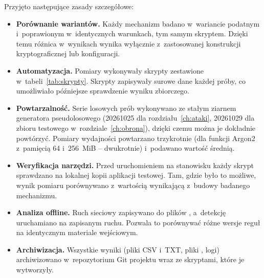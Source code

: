 Przyjęto następujące zasady szczegółowe:
\begin{itemize}
  \item \textbf{Porównanie wariantów.} Każdy mechanizm badano w~wariancie podatnym i~poprawionym w~identycznych warunkach, tym samym skryptem. Dzięki temu różnica w~wynikach wynika wyłącznie z~zastosowanej konstrukcji kryptograficznej lub konfiguracji.
  \item \textbf{Automatyzacja.} Pomiary wykonywały skrypty zestawione w~tabeli~\ref{tab:skrypty}. Skrypty zapisywały surowe dane każdej próby, co umożliwiało późniejsze sprawdzenie wyniku zbiorczego.
  \item \textbf{Powtarzalność.} Serie losowych prób wykonywano ze stałym ziarnem generatora pseudolosowego (20261025 dla rozdziału~\ref{ch:ataki}, 20261029 dla zbioru testowego w~rozdziale~\ref{ch:obrona}), dzięki czemu można je dokładnie powtórzyć. Pomiary wydajności powtarzano trzykrotnie (dla funkcji Argon2 z~pamięcią 64 i~256~MiB -- dwukrotnie) i~podawano wartość średnią.
  \item \textbf{Weryfikacja narzędzi.} Przed uruchomieniem na stanowisku każdy skrypt sprawdzano na lokalnej kopii aplikacji testowej. Tam, gdzie było to możliwe, wynik pomiaru porównywano z~wartością wynikającą z~budowy badanego mechanizmu.
  \item \textbf{Analiza offline.} Ruch sieciowy zapisywano do plików , a~detekcję uruchamiano na zapisanym ruchu. Pozwala to porównywać różne wersje reguł na identycznym materiale wejściowym.
  \item \textbf{Archiwizacja.} Wszystkie wyniki (pliki CSV i~TXT, pliki , logi) archiwizowano w~repozytorium Git projektu wraz ze skryptami, które je wytworzyły.
\end{itemize}

